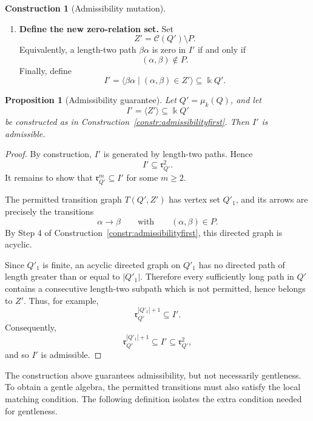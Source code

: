 \documentclass[11pt]{article}
\newcommand{\K}{\Bbbk}
\newcommand{\rad}{\mathfrak r}
\theoremstyle{plain}
\newtheorem{proposition}[theorem]{Proposition}
\theoremstyle{definition}
\newtheorem{construction}[theorem]{Construction}
\theoremstyle{remark}
\begin{document}
\begin{construction}[Admissibility mutation]
\begin{enumerate}[label=\textbf{Step \arabic*.},leftmargin=3em]
  \item \textbf{Define the new zero-relation set.}
  Set
  \[
    Z'=\mathcal C(Q')\setminus P.
  \]
  Equivalently, a length-two path \(\beta\alpha\) is zero in \(I'\) if and only
  if
  \[
    (\alpha,\beta)\notin P.
  \]
  Finally, define
  \[
    I'
    =
    \langle \beta\alpha\mid (\alpha,\beta)\in Z'\rangle
    \subseteq \K Q'.
  \]
\end{enumerate}
\end{construction}

\begin{proposition}[Admissibility guarantee]
\label{prop:admissibility-first-guarantee}
Let \(Q'=\mu_k(Q)\), and let
\[
  I'=\langle Z'\rangle\subseteq \K Q'
\]
be constructed as in Construction~\ref{constr:admissibilityfirst}.  Then
\(I'\) is admissible.
\end{proposition}

\begin{proof}
By construction, \(I'\) is generated by length-two paths. Hence
\[
  I'\subseteq \rad_{Q'}^2.
\]
It remains to show that \(\rad_{Q'}^m\subseteq I'\) for some \(m\geq 2\).

The permitted transition graph \(T(Q',Z')\) has vertex set \(Q'_1\), and its
arrows are precisely the transitions
\[
  \alpha\longrightarrow \beta
  \qquad\text{with}\qquad
  (\alpha,\beta)\in P.
\]
By Step 4 of Construction~\ref{constr:admissibilityfirst}, this directed graph
is acyclic.

Since \(Q'_1\) is finite, an acyclic directed graph on \(Q'_1\) has no directed
path of length greater than or equal to \(|Q'_1|\). Therefore every sufficiently
long path in \(Q'\) contains a consecutive length-two subpath which is not
permitted, hence belongs to \(Z'\). Thus, for example,
\[
  \rad_{Q'}^{|Q'_1|+1}\subseteq I'.
\]
Consequently,
\[
  \rad_{Q'}^{|Q'_1|+1}\subseteq I'\subseteq \rad_{Q'}^2,
\]
and so \(I'\) is admissible.
\end{proof}

The construction above guarantees admissibility, but not necessarily gentleness.
To obtain a gentle algebra, the permitted transitions must also satisfy the
local matching condition.  The following definition isolates the extra
condition needed for gentleness.
\end{document}
